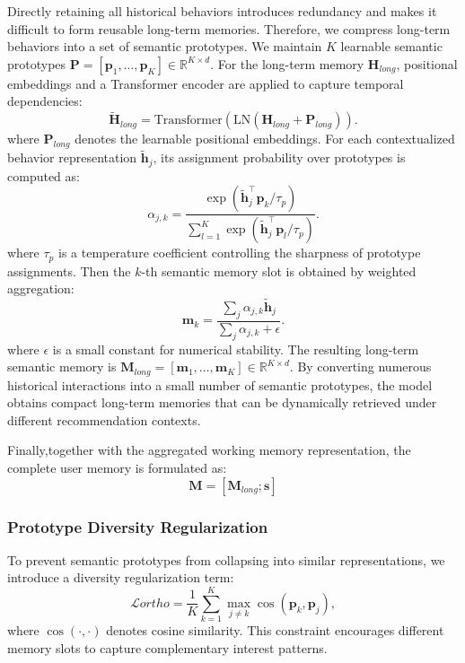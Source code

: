 \documentclass[letterpaper]{article} %
\theoremstyle{definition} %
\begin{document}
Directly retaining all historical behaviors introduces redundancy and makes it difficult to form reusable long-term memories. Therefore, we compress long-term behaviors into a set of semantic prototypes. We maintain $K$ learnable semantic prototypes $\bm{P}=[\bm{p}_1,\ldots,\bm{p}_K]\in\mathbb{R}^{K\times d}$. For the long-term memory $\bm{H}_{long}$, positional embeddings and a Transformer encoder are applied to capture temporal dependencies:
\begin{equation}
\widetilde{\bm{H}}_{long}=\text{Transformer}(\text{LN}(\bm{H}_{long}+\bm{P}_{long})).
\end{equation}
where $\bm{P}_{long}$ denotes the learnable positional embeddings. For each contextualized behavior representation $\widetilde{\bm{h}}_j$, its assignment probability over prototypes is computed as:
\begin{equation}
\alpha_{j,k}=
\frac{\exp(\widetilde{\bm{h}}_j^\top\bm{p}_k/\tau_p)}
{\sum_{l=1}^{K}\exp(\widetilde{\bm{h}}_j^\top\bm{p}_l/\tau_p)}.
\end{equation}
where $\tau_p$ is a temperature coefficient controlling the sharpness of prototype assignments. Then the $k$-th semantic memory slot is obtained by weighted aggregation:
\begin{equation}
\bm{m}_k=
\frac{\sum_j\alpha_{j,k}\widetilde{\bm{h}}_j}
{\sum_j\alpha_{j,k}+\epsilon}.
\end{equation}
where $\epsilon$ is a small constant for numerical stability. The resulting long-term semantic memory is $\bm{M}_{long}=[\bm{m}_1,\ldots,\bm{m}_K]\in\mathbb{R}^{K\times d}$. By converting numerous historical interactions into a small number of semantic prototypes, the model obtains compact long-term memories that can be dynamically retrieved under different recommendation contexts.

Finally,together with the aggregated working memory representation, the complete user memory is formulated as:
\begin{equation}
\bm{M}=[\mathbf{M}_{long};\mathbf{s}] 
\end{equation}
\subsubsection{Prototype Diversity Regularization}

To prevent semantic prototypes from collapsing into similar representations, we introduce a diversity regularization term:
\begin{equation}
 \mathcal{L}{ortho} = \frac{1}{K}\sum_{k=1}^{K} \max_{ j\neq k} \cos(\mathbf{p}_k, \mathbf{p}_j),
\end{equation}
where $\cos(\cdot,\cdot)$ denotes cosine similarity. This constraint encourages different memory slots to capture complementary interest patterns.
\end{document}

